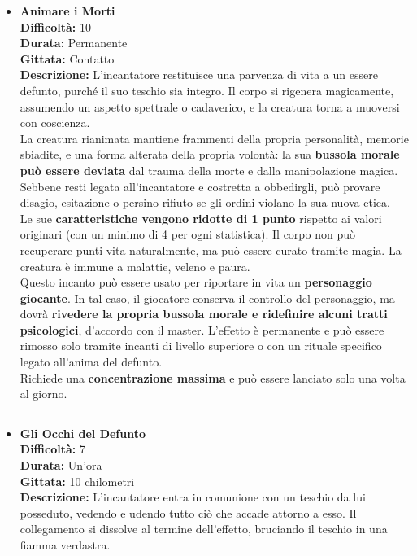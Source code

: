 \documentclass[./magie.tex]{subfiles}
\begin{document}
\begin{itemize}

\item \textbf{Animare i Morti} \\
\textbf{Difficoltà:} 10 \\
\textbf{Durata:} Permanente \\
\textbf{Gittata:} Contatto \\
\textbf{Descrizione:} L'incantatore restituisce una parvenza di vita a un essere defunto, purché il suo teschio sia integro. Il corpo si rigenera magicamente, assumendo un aspetto spettrale o cadaverico, e la creatura torna a muoversi con coscienza.\\

La creatura rianimata mantiene frammenti della propria personalità, memorie sbiadite, e una forma alterata della propria volontà: la sua \textbf{bussola morale può essere deviata} dal trauma della morte e dalla manipolazione magica. Sebbene resti legata all'incantatore e costretta a obbedirgli, può provare disagio, esitazione o persino rifiuto se gli ordini violano la sua nuova etica.\\

Le sue \textbf{caratteristiche vengono ridotte di 1 punto} rispetto ai valori originari (con un minimo di 4 per ogni statistica). Il corpo non può recuperare punti vita naturalmente, ma può essere curato tramite magia. La creatura è immune a malattie, veleno e paura.\\

Questo incanto può essere usato per riportare in vita un \textbf{personaggio giocante}. In tal caso, il giocatore conserva il controllo del personaggio, ma dovrà \textbf{rivedere la propria bussola morale e ridefinire alcuni tratti psicologici}, d'accordo con il master. L’effetto è permanente e può essere rimosso solo tramite incanti di livello superiore o con un rituale specifico legato all’anima del defunto.\\

Richiede una \textbf{concentrazione massima} e può essere lanciato solo una volta al giorno.


\vspace{0.5cm}\rule{\textwidth}{0.4pt}\vspace{1cm}

\item \textbf{Gli Occhi del Defunto} \\
\textbf{Difficoltà:} 7 \\
\textbf{Durata:} Un’ora \\
\textbf{Gittata:} 10 chilometri \\
\textbf{Descrizione:} L’incantatore entra in comunione con un teschio da lui posseduto, vedendo e udendo tutto ciò che accade attorno a esso. Il collegamento si dissolve al termine dell’effetto, bruciando il teschio in una fiamma verdastra.


\end{itemize}
\end{document}
